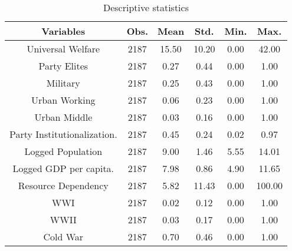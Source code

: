 \begin{table}[ht]
\centering
\caption{Descriptive statistics}
	\begin{adjustbox}{width=0.7\textwidth}
\begin{tabular}{cccccc}
  \hline
		Variables & Obs. & Mean & Std. & Min. & Max. \\ 

  \hline
		Universal Welfare & 2187 & 15.50 & 10.20 & 0.00 & 42.00 \\
		[0.5em] 
		Party Elites & 2187 & 0.27 & 0.44 & 0.00 & 1.00 \\ 
		[0.5em]
		Military & 2187 & 0.25 & 0.43 & 0.00 & 1.00 \\ 
		[0.5em]
		Urban Working & 2187 & 0.06 & 0.23 & 0.00 & 1.00 \\ 
		[0.5em]
		Urban Middle & 2187 & 0.03 & 0.16 & 0.00 & 1.00 \\ 
		[0.5em]
		Party Institutionalization. & 2187 & 0.45 & 0.24 & 0.02 & 0.97 \\ 
		[0.5em]
		Logged Population & 2187 & 9.00 & 1.46 & 5.55 & 14.01 \\ 
		[0.5em]
		Logged GDP per capita. & 2187 & 7.98 & 0.86 & 4.90 & 11.65 \\ 
		[0.5em]
		Resource Dependency & 2187 & 5.82 & 11.43 & 0.00 & 100.00 \\ 
		[0.5em]
		WWI & 2187 & 0.02 & 0.12 & 0.00 & 1.00 \\ 
		[0.5em]
		WWII & 2187 & 0.03 & 0.17 & 0.00 & 1.00 \\ 
		[0.5em]
		Cold War & 2187 & 0.70 & 0.46 & 0.00 & 1.00 \\ 
		[0.5em]
   \hline
\end{tabular}
\end{adjustbox}
\label{tab:appendesc}
\end{table}